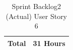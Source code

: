 \documentclass[12pt]{report}
\begin{document}
\begin{table}[h]
{\begin{tabular}{|cc|cccccccc|}
\multicolumn{2}{|c|}{\textbf{Total}}                                                                                                                                                  & \multicolumn{8}{c|}{31   Hours}                                                                                                                                                                                                                                                                                                                                                                                                                                                                                                                                                                                                                                                                                                                                                                                                                                                                                            \\ \hline
\end{tabular}
}
\caption{Sprint Backlog2 (Actual) User Story 6}
\label{tab:mytable}
\end{table}
\end{document}
